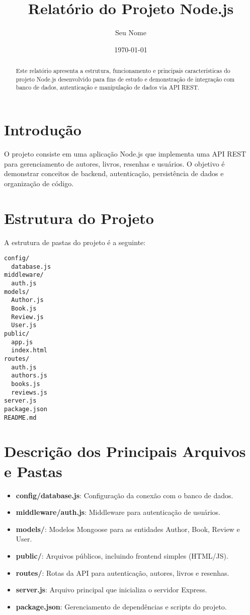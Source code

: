 \documentclass[12pt,a4paper]{article}
\title{Relatório do Projeto Node.js}
\author{Seu Nome}
\date{\today}
\begin{document}
\maketitle

\begin{abstract}
Este relatório apresenta a estrutura, funcionamento e principais características do projeto Node.js desenvolvido para fins de estudo e demonstração de integração com banco de dados, autenticação e manipulação de dados via API REST.
\end{abstract}

\tableofcontents
\newpage

\section{Introdução}
O projeto consiste em uma aplicação Node.js que implementa uma API REST para gerenciamento de autores, livros, resenhas e usuários. O objetivo é demonstrar conceitos de backend, autenticação, persistência de dados e organização de código.

\section{Estrutura do Projeto}
A estrutura de pastas do projeto é a seguinte:

\begin{verbatim}
config/
  database.js
middleware/
  auth.js
models/
  Author.js
  Book.js
  Review.js
  User.js
public/
  app.js
  index.html
routes/
  auth.js
  authors.js
  books.js
  reviews.js
server.js
package.json
README.md
\end{verbatim}

\section{Descrição dos Principais Arquivos e Pastas}
\begin{itemize}
  \item \textbf{config/database.js}: Configuração da conexão com o banco de dados.
  \item \textbf{middleware/auth.js}: Middleware para autenticação de usuários.
  \item \textbf{models/}: Modelos Mongoose para as entidades Author, Book, Review e User.
  \item \textbf{public/}: Arquivos públicos, incluindo frontend simples (HTML/JS).
  \item \textbf{routes/}: Rotas da API para autenticação, autores, livros e resenhas.
  \item \textbf{server.js}: Arquivo principal que inicializa o servidor Express.
  \item \textbf{package.json}: Gerenciamento de dependências e scripts do projeto.
\end{itemize}
\end{document}
